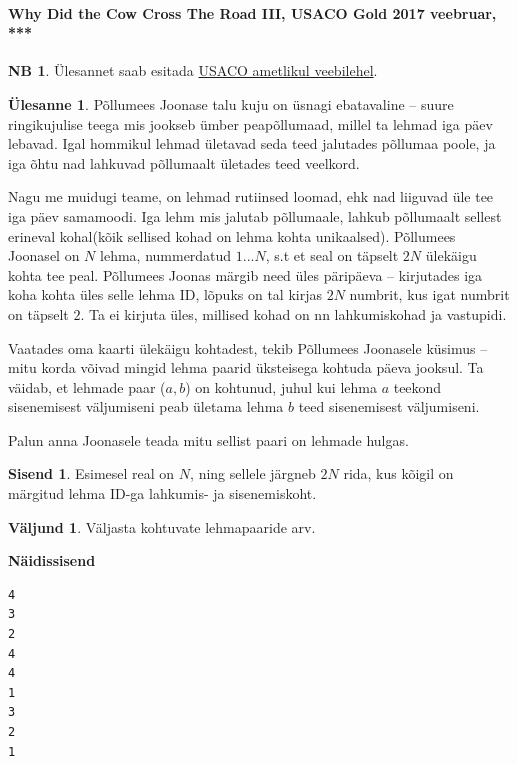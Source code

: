 \documentclass{trkut}
\theoremstyle{definition}
\newtheorem*{extra}{NB}
\newtheorem*{Input}{Sisend}
\newtheorem*{Output}{Väljund}
\newtheorem*{Text}{Ülesanne}
\begin{document}
\paragraph{Why Did the Cow Cross The Road III, USACO Gold 2017 veebruar, ***}
\begin{extra}
Ülesannet saab esitada \href{http://www.usaco.org/index.php?page=viewproblem2&cpid=719}{USACO ametlikul veebilehel}.
\end{extra}
\begin{Text}
Põllumees Joonase talu kuju on üsnagi ebatavaline -- suure ringikujulise teega mis jookseb ümber peapõllumaad, millel ta lehmad iga päev lebavad.
Igal hommikul lehmad ületavad seda teed jalutades põllumaa poole, ja iga õhtu nad lahkuvad põllumaalt ületades teed veelkord.

Nagu me muidugi teame, on lehmad rutiinsed loomad, ehk nad liiguvad üle tee iga päev samamoodi. Iga lehm mis jalutab põllumaale, lahkub põllumaalt sellest erineval kohal(kõik sellised kohad on lehma kohta unikaalsed). Põllumees Joonasel on $N$ lehma, nummerdatud $1...N$, s.t et seal on täpselt $2N$ ülekäigu kohta tee peal. Põllumees Joonas märgib need üles päripäeva -- kirjutades iga koha kohta üles selle lehma ID, lõpuks on tal kirjas $2N$ numbrit, kus igat numbrit on täpselt $2$. Ta ei kirjuta üles, millised kohad on nn lahkumiskohad ja vastupidi.

Vaatades oma kaarti ülekäigu kohtadest, tekib Põllumees Joonasele küsimus -- mitu korda võivad mingid lehma paarid üksteisega kohtuda päeva jooksul. Ta väidab, et lehmade paar ($a, b$) on kohtunud, juhul kui lehma $a$ teekond sisenemisest väljumiseni peab ületama lehma $b$ teed sisenemisest väljumiseni.

Palun anna Joonasele teada mitu sellist paari on lehmade hulgas.

\parencite{20}
\end{Text}
\begin{Input}
Esimesel real on $N$, ning sellele järgneb $2N$ rida, kus kõigil on märgitud lehma ID-ga lahkumis- ja sisenemiskoht.
\end{Input}
\begin{Output}
Väljasta kohtuvate lehmapaaride arv.
\end{Output}



\textbf{Näidissisend}

\begin{verbatim}
4
3
2
4
4
1
3
2
1
\end{verbatim}
\end{document}
